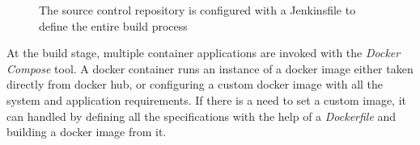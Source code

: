 \vspace{0.5cm}
\begin{figure}[H]
\caption [Configuration of the project’s source control repository]{The source control repository is configured with a Jenkinsfile to define the entire build process}
\end{figure}

At the build stage, multiple container applications are invoked with the \emph{Docker Compose} tool. A docker container runs an instance of a docker image either taken directly from docker hub, or configuring a custom docker image with all the system and application requirements. If there is a need to set a custom image, it can handled by defining all the specifications with the help of a \emph{Dockerfile} and building a docker image from it. 

